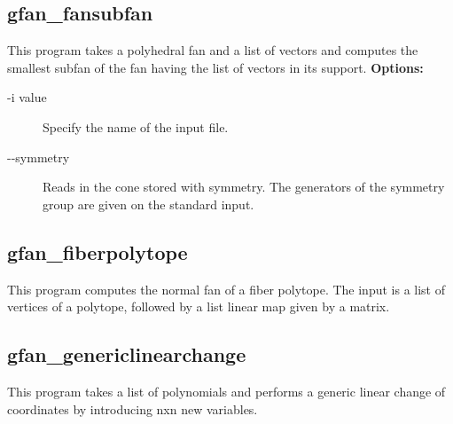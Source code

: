 {{{{{{{{{{{{\subsection{gfan\_fansubfan}\label{applist:_fansubfan}
This program takes a polyhedral fan and a list of vectors and computes the smallest subfan of the fan having the list of vectors in its support.
\newline
{\bf Options:}
\begin{description}
\item[-i value]Specify the name of the input file.\item[-\hspace{0.013cm}-symmetry]Reads in the cone stored with symmetry. The generators of the symmetry group are given on the standard input.
\end{description}


{\subsection{gfan\_fiberpolytope}\label{applist:_fiberpolytope}
This program computes the normal fan of a fiber polytope. The input is a list of vertices of a polytope, followed by a list linear map given by a matrix.


{\subsection{gfan\_genericlinearchange}\label{applist:_genericlinearchange}
This program takes a list of polynomials and performs a generic linear change of coordinates by introducing nxn new variables.


}}}}}}}}}}}}}}
